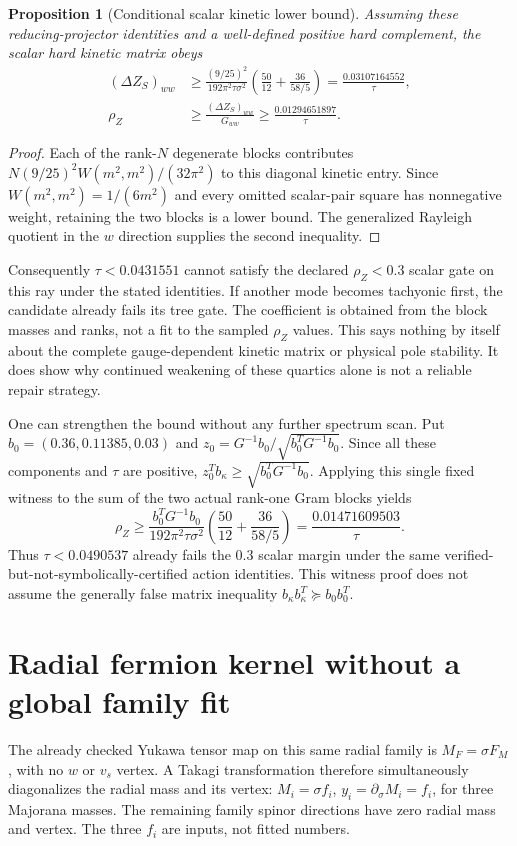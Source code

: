 \documentclass[11pt]{article}
\newtheorem{proposition}{Proposition}
\begin{document}
\begin{proposition}[Conditional scalar kinetic lower bound]
Assuming these reducing-projector identities and a well-defined
positive hard complement, the scalar hard kinetic matrix obeys
\begin{align}
 (\Delta Z_S)_{ww}&\ge
 \frac{(9/25)^2}{192\pi^2\tau\sigma^2}
 \left(\frac{50}{12}+\frac{36}{58/5}\right)
 =\frac{0.03107164552}{\tau},\\
 \rho_Z&\ge\frac{(\Delta Z_S)_{ww}}{G_{ww}}
 \ge\frac{0.01294651897}{\tau}.
\end{align}
\end{proposition}
\begin{proof}
Each of the rank-$N$ degenerate blocks contributes
$N(9/25)^2W(m^2,m^2)/(32\pi^2)$ to this diagonal kinetic entry.
Since $W(m^2,m^2)=1/(6m^2)$ and every omitted scalar-pair square has
nonnegative weight, retaining the two blocks is a lower bound.
The generalized Rayleigh quotient in the $w$ direction supplies
the second inequality.
\end{proof}
Consequently $\tau<0.0431551$ cannot satisfy the declared $\rho_Z<0.3$
scalar gate on this ray under the stated identities. If another mode
becomes tachyonic first, the candidate already fails its tree gate.
The coefficient is obtained from the block masses and ranks, not a
fit to the sampled $\rho_Z$ values. This says nothing by itself about
the complete gauge-dependent kinetic matrix or physical pole stability.
It does show why continued weakening of these quartics alone is not
a reliable repair strategy.

One can strengthen the bound without any further spectrum scan. Put
$b_0=(0.36,0.11385,0.03)$ and
$z_0=G^{-1}b_0/\sqrt{b_0^TG^{-1}b_0}$. Since all these components and
$\tau$ are positive, $z_0^Tb_\kappa\ge\sqrt{b_0^TG^{-1}b_0}$.
Applying this single fixed witness to the sum of the two actual
rank-one Gram blocks yields
\begin{equation}
 \rho_Z\ge\frac{b_0^TG^{-1}b_0}{192\pi^2\tau\sigma^2}
 \left(\frac{50}{12}+\frac{36}{58/5}\right)
 =\frac{0.01471609503}{\tau}.
\end{equation}
Thus $\tau<0.0490537$ already fails the $0.3$ scalar margin under the
same verified-but-not-symbolically-certified action identities.
This witness proof does not assume the generally false matrix inequality
$b_\kappa b_\kappa^T\succeq b_0b_0^T$.

\section{Radial fermion kernel without a global family fit}
The already checked Yukawa tensor map on this same radial family is
$M_F=\sigma F_M$, with no $w$ or $v_s$ vertex. A Takagi transformation
therefore simultaneously diagonalizes the radial mass and its vertex:
$M_i=\sigma f_i$, $y_i=\partial_\sigma M_i=f_i$, for three Majorana
masses. The remaining family spinor directions have zero radial mass
and vertex. The three $f_i$ are inputs, not fitted numbers.
\end{document}
